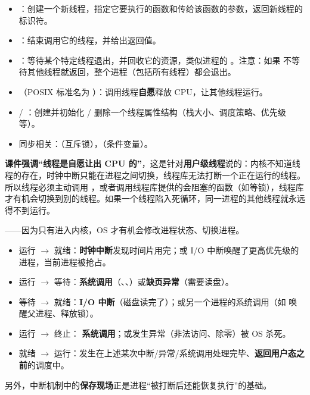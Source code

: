 \begin{itemize}
    \item {}：创建一个新线程，指定它要执行的函数和传给该函数的参数，返回新线程的标识符。
    \item {}：结束调用它的线程，并给出返回值。
    \item {}：等待某个特定线程退出，并回收它的资源，类似进程的 。注意：如果  不等待其他线程就返回，整个进程（包括所有线程）都会退出。
    \item {}（POSIX 标准名为 ）：调用线程\textbf{自愿}释放 CPU，让其他线程运行。
    \item {} / ：创建并初始化 / 删除一个线程属性结构（栈大小、调度策略、优先级等）。
    \item 同步相关：（互斥锁），（条件变量）。
\end{itemize}
\textbf{课件强调“线程是自愿让出 CPU 的”}，这是针对\textbf{用户级线程}说的：内核不知道线程的存在，时钟中断只能在进程之间切换，线程库无法打断一个正在运行的线程。所以线程必须主动调用 ，或者调用线程库提供的会阻塞的函数（如等锁），线程库才有机会切换到别的线程。如果一个线程陷入死循环，同一进程的其他线程就永远得不到运行。

——因为只有进入内核，OS 才有机会修改进程状态、切换进程。
\begin{itemize}
    \item 运行 $\to$ 就绪：\textbf{时钟中断}发现时间片用完；或 I/O 中断唤醒了更高优先级的进程，当前进程被抢占。
    \item 运行 $\to$ 等待：\textbf{系统调用}（、、）或\textbf{缺页异常}（需要读盘）。
    \item 等待 $\to$ 就绪：\textbf{I/O 中断}（磁盘读完了）；或另一个进程的系统调用（如  唤醒父进程、释放锁）。
    \item 运行 $\to$ 终止： \textbf{系统调用}；或发生异常（非法访问、除零）被 OS 杀死。
    \item 就绪 $\to$ 运行：发生在上述某次中断/异常/系统调用处理完毕、\textbf{返回用户态之前}的调度中。
\end{itemize}
另外，中断机制中的\textbf{保存现场}正是进程“被打断后还能恢复执行”的基础。

